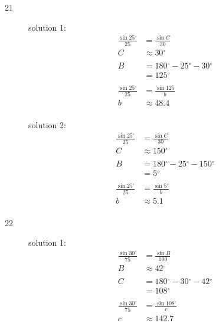 \documentclass{exam}
\newcommand{\dg}{\ensuremath{^\circ}}
\begin{document}
\begin{description}
      \item[21] 
        solution 1:
        \begin{align*}
          \frac{\sin 25 \dg}{25} & = \frac{\sin C}{30} \\
          C                      & \approx \boxed{ 30 \dg } \\
          \\
          B & = 180 \dg - 25 \dg - 30 \dg \\
            & = \boxed{ 125 \dg } \\
          \\
          \frac{\sin 25 \dg}{25} & = \frac{\sin 125}{b} \\
          b                      & \approx \boxed{ 48.4 } \\
        \end{align*}

        solution 2:
        \begin{align*}
          \frac{\sin 25 \dg}{25} & = \frac{\sin C}{30} \\
          C                      & \approx \boxed{ 150 \dg } \\
          \\
          B & = 180 \dg - 25 \dg - 150 \dg \\
            & = \boxed{ 5 \dg } \\
          \\
          \frac{\sin 25 \dg}{25} & = \frac{\sin 5 \dg}{b} \\
          b                      & \approx \boxed{ 5.1 } \\
        \end{align*}

      \item[22] 
        solution 1:
        \begin{align*}
          \frac{\sin 30 \dg}{75} & = \frac{\sin B}{100} \\
          B                      & \approx \boxed{ 42 \dg } \\
          \\
          C & = 180 \dg - 30 \dg - 42 \dg \\
            & = \boxed{ 108 \dg } \\
          \\
          \frac{\sin 30 \dg}{75} & = \frac{\sin 108 \dg}{c} \\
          c                      & \approx \boxed{ 142.7 } \\
        \end{align*}


\end{description}
\end{document}
